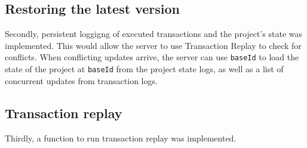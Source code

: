 \documentclass[a4paper, 11pt, oneside]{article}
\theoremstyle{definition}
\begin{document}
\subsection*{Restoring the latest version}

Secondly, persistent loggigng of executed transactions and the project's state was implemented. This would allow the server to use Transaction Replay to check for conflicts. When conflicting updates arrive, the server can use \verb|baseId| to load the state of the project at \verb|baseId| from the project state logs, as well as a list of concurrent updates from transaction logs.

\subsection{Transaction replay}

Thirdly, a function to run transaction replay was implemented.

\newpage
\printbibliography
\clearpage
\end{document}
